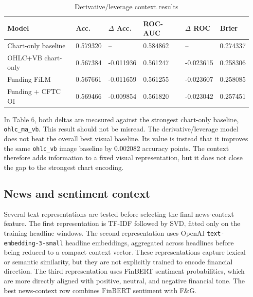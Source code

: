 \documentclass[14pt,a4paper]{extarticle}
\newcommand{\code}[1]{\texttt{#1}}
\begin{document}
\begin{table}[H]
\caption{Derivative/leverage context results}
\begin{center}
\small
\setlength{\tabcolsep}{3pt}
\begin{tabular}{p{}p{}p{}p{}p{}p{}}
\toprule
\textbf{Model} & \textbf{Acc.} & \textbf{$\Delta$ Acc.} & \textbf{ROC-AUC} & \textbf{$\Delta$ ROC} & \textbf{Brier}\\
\midrule
Chart-only baseline & 0.579320 & -- & 0.584862 & -- & 0.274337\\
OHLC+VB chart-only & 0.567384 & -0.011936 & 0.561247 & -0.023615 & 0.258306\\
Funding FiLM & 0.567661 & -0.011659 & 0.561255 & -0.023607 & 0.258085\\
Funding + CFTC OI & 0.569466 & -0.009854 & 0.561820 & -0.023042 & 0.257451\\
\bottomrule
\end{tabular}
\end{center}
\end{table}

In Table 6, both deltas are measured against the strongest chart-only baseline, \code{ohlc\_ma\_vb}. This result should not be misread. The derivative/leverage model does not beat the overall best visual baseline. Its value is instead that it improves the same \code{ohlc\_vb} image baseline by 0.002082 accuracy points. The context therefore adds information to a fixed visual representation, but it does not close the gap to the strongest chart encoding.

\subsection{News and sentiment context}

Several text representations are tested before selecting the final news-context feature. The first representation is TF-IDF followed by SVD, fitted only on the training headline windows. The second representation uses OpenAI \code{text-embedding-3-small} headline embeddings, aggregated across headlines before being reduced to a compact context vector. These representations capture lexical or semantic similarity, but they are not explicitly trained to encode financial direction. The third representation uses FinBERT sentiment probabilities, which are more directly aligned with positive, neutral, and negative financial tone. The best news-context row combines FinBERT sentiment with F\&G.
\end{document}
